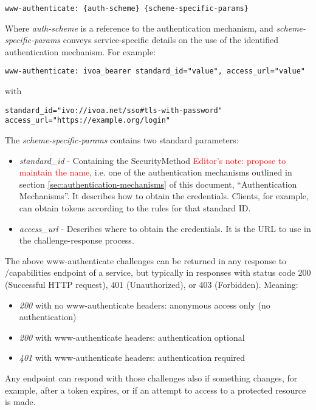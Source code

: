 \documentclass[11pt,a4paper]{ivoa}
\begin{document}
\begin{verbatim}
www-authenticate: {auth-scheme} {scheme-specific-params}
\end{verbatim}

Where \emph{auth-scheme} is a reference to the authentication mechanism,
and \emph{scheme-specific-params} conveys service-specific details on
the use of the identified authentication mechanism. For example:
\begin{verbatim}
www-authenticate: ivoa_bearer standard_id="value", access_url="value"
\end{verbatim}
with
\begin{verbatim}
standard_id="ivo://ivoa.net/sso#tls-with-password"
access_url="https://example.org/login"
\end{verbatim}
The \emph{scheme-specific-params} contains two standard
parameters:
\begin{itemize}
\item{\emph{standard\_id}} - Containing the SecurityMethod
\textcolor{red}{Editor's note:
propose to maintain the name}, i.e. one of the authentication mechanisms
outlined in section \ref{sec:authentication-mechanisms} of this
document,
``Authentication Mechanisms''.  It describes how to
obtain the credentials. Clients, for example, can obtain tokens
according to the rules for that standard ID.
\item{\emph{access\_url}} - Describes where to obtain the credentials.
It is the URL to use in the challenge-response process.
\end{itemize}

The above www-authenticate challenges can be returned in any response
to /capabilities endpoint of a service, but
typically in responses with status code 200 (Successful HTTP request), 401
(Unauthorized), or 403 (Forbidden). Meaning:

\begin{itemize}
\item{\emph{200}} with no www-authenticate headers: anonymous access only
(no authentication)
\item{\emph{200}} with www-authenticate headers: authentication optional
\item{\emph{401}} with www-authenticate headers: authentication required
\end{itemize}

Any endpoint can respond with those challenges also
if something changes, for example, after a token expires, or if an
attempt to  access to a protected resource is made.
\end{document}
